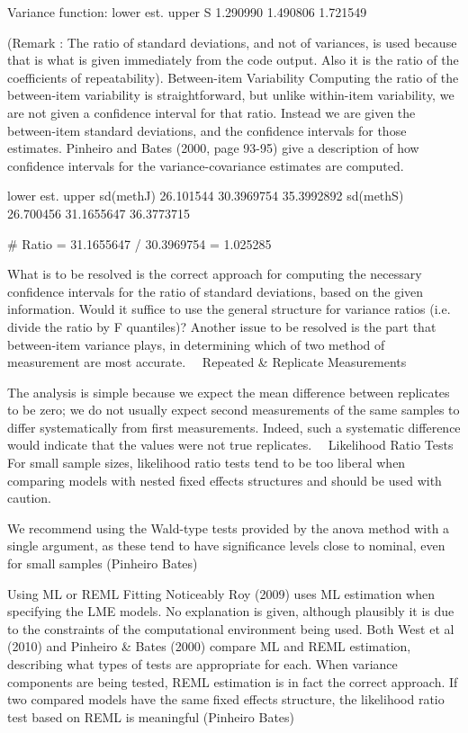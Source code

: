 Variance function:
lower     est.    upper
S 1.290990 1.490806 1.721549

(Remark :  The ratio of standard deviations, and not of variances,  is used because that is what is given immediately from the code output.  Also it is the ratio of the coefficients of repeatability).
Between-item Variability
Computing the ratio of the between-item variability is straightforward, but unlike within-item variability, we are not given a confidence interval for that ratio. Instead we are given the between-item standard deviations, and the confidence intervals for those estimates.
Pinheiro and Bates (2000, page 93-95) give a description of how confidence intervals for the variance-covariance estimates are computed.


lower       est.      upper
sd(methJ)        26.101544 30.3969754 35.3992892
sd(methS)        26.700456 31.1655647 36.3773715

# Ratio = 31.1655647 / 30.3969754 =  1.025285


What is to be resolved is the correct approach for computing the necessary confidence intervals for the ratio of standard deviations, based on the given information. 
Would it suffice to use the general structure for variance ratios (i.e. divide the ratio by F quantiles)?
Another issue to be resolved is the part that between-item variance plays, in determining which of two method of measurement are most accurate. 
Repeated & Replicate Measurements

The analysis is simple because we expect the mean difference between replicates to
be zero;  we do not usually expect second measurements of the same samples to differ
systematically from first measurements. Indeed, such a systematic difference would
indicate that the values were not true replicates. 
Likelihood Ratio Tests
For small sample sizes, likelihood ratio tests tend to be too liberal when comparing models with nested fixed effects structures and should be used with caution.

We recommend using the Wald-type tests provided by the anova method with a single argument, as these tend to have significance levels close to nominal, even for small samples (Pinheiro Bates)

Using ML or REML Fitting
Noticeably Roy (2009) uses ML estimation when specifying the LME models. No explanation is given, although plausibly it is due to the constraints of the computational environment being used.
Both West et al (2010) and Pinheiro & Bates (2000) compare ML and REML estimation, describing what types of tests are appropriate for each.  When variance components are being tested, REML estimation is in fact the correct approach. 
If two compared models have the same fixed effects structure, the likelihood ratio test based on REML is meaningful  (Pinheiro Bates)

